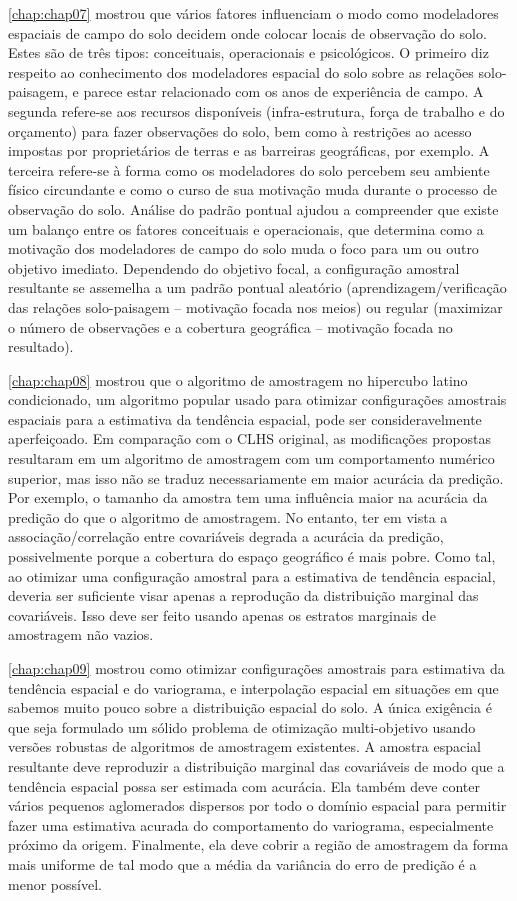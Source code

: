 \autoref{chap:chap07} mostrou que vários fatores influenciam o modo como modeladores espaciais de campo 
do solo decidem onde colocar locais de observação do solo. Estes são de três tipos: conceituais, operacionais 
e psicológicos. O primeiro diz respeito ao conhecimento dos modeladores espacial do solo sobre as relações 
solo-paisagem, e parece estar relacionado com os anos de experiência de campo. A segunda refere-se aos 
recursos disponíveis (infra-estrutura, força de trabalho e do orçamento) para fazer observações do solo, bem 
como à restrições ao acesso impostas por proprietários de terras e as barreiras geográficas, por exemplo. A 
terceira refere-se à forma como os modeladores do solo percebem seu ambiente físico circundante e como o curso 
de sua motivação muda durante o processo de observação do solo. Análise do padrão pontual ajudou a compreender 
que existe um balanço entre os fatores conceituais e operacionais, que determina como a motivação dos 
modeladores de campo do solo muda o foco para um ou outro objetivo imediato. Dependendo do objetivo focal, a 
configuração amostral resultante se assemelha a um padrão pontual aleatório (aprendizagem/verificação das 
relações solo-paisagem -- motivação focada nos meios) ou regular (maximizar o número de observações e a 
cobertura geográfica -- motivação focada no resultado).

\autoref{chap:chap08} mostrou que o algoritmo de amostragem no hipercubo latino condicionado, um algoritmo 
popular usado para otimizar configurações amostrais espaciais para a estimativa da tendência espacial, pode 
ser consideravelmente aperfeiçoado. Em comparação com o CLHS original, as modificações propostas resultaram em 
um algoritmo de amostragem com um comportamento numérico superior, mas isso não se traduz necessariamente em 
maior acurácia da predição. Por exemplo, o tamanho da amostra tem uma influência maior na acurácia da predição 
do que o algoritmo de amostragem. No entanto, ter em vista a associação/correlação entre covariáveis degrada 
a acurácia da predição, possivelmente porque a cobertura do espaço geográfico é mais pobre. Como tal, ao 
otimizar uma configuração amostral para a estimativa de tendência espacial, deveria ser suficiente visar 
apenas a reprodução da distribuição marginal das covariáveis. Isso deve ser feito usando apenas os estratos 
marginais de amostragem não vazios.

\autoref{chap:chap09} mostrou como otimizar configurações amostrais para estimativa da tendência espacial e do 
variograma, e interpolação espacial em situações em que sabemos muito pouco sobre a distribuição espacial do 
solo. A única exigência é que seja formulado um sólido problema de otimização multi-objetivo usando versões 
robustas de algoritmos de amostragem existentes. A amostra espacial resultante deve reproduzir a distribuição 
marginal das covariáveis de modo que a tendência espacial possa ser estimada com acurácia. Ela também deve 
conter vários pequenos aglomerados dispersos por todo o domínio espacial para permitir fazer uma estimativa 
acurada do comportamento do variograma, especialmente próximo da origem. Finalmente, ela deve cobrir a região 
de amostragem da forma mais uniforme de tal modo que a média da variância do erro de predição é a menor 
possível.


